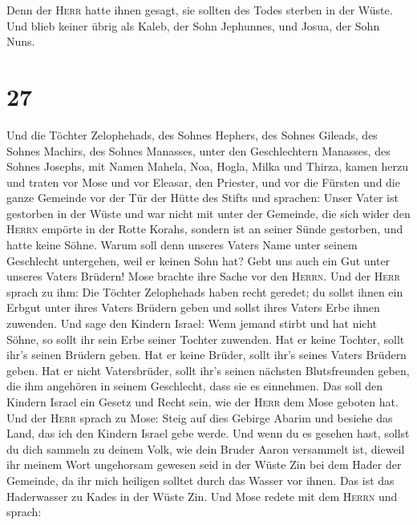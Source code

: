  Denn der \textsc{Herr} hatte ihnen gesagt, sie sollten
des Todes sterben in der Wüste. Und blieb keiner übrig als Kaleb, der
Sohn Jephunnes, und Josua, der Sohn Nuns.

\hypertarget{section-26}{%
\section{27}\label{section-26}}

 Und die Töchter Zelophehads, des Sohnes Hephers, des
Sohnes Gileads, des Sohnes Machirs, des Sohnes Manasses, unter den
Geschlechtern Manasses, des Sohnes Josephs, mit Namen Mahela, Noa,
Hogla, Milka und Thirza, kamen herzu  und traten vor Mose
und vor Eleasar, den Priester, und vor die Fürsten und die ganze
Gemeinde vor der Tür der Hütte des Stifts und sprachen: 
Unser Vater ist gestorben in der Wüste und war nicht mit unter der
Gemeinde, die sich wider den \textsc{Herrn} empörte in der Rotte Korahs,
sondern ist an seiner Sünde gestorben, und hatte keine Söhne.
 Warum soll denn unseres Vaters Name unter seinem
Geschlecht untergehen, weil er keinen Sohn hat? Gebt uns auch ein Gut
unter unseres Vaters Brüdern!  Mose brachte ihre Sache vor
den \textsc{Herrn}.  Und der \textsc{Herr} sprach zu ihm:
 Die Töchter Zelophehads haben recht geredet; du sollst
ihnen ein Erbgut unter ihres Vaters Brüdern geben und sollst ihres
Vaters Erbe ihnen zuwenden.  Und sage den Kindern Israel:
Wenn jemand stirbt und hat nicht Söhne, so sollt ihr sein Erbe seiner
Tochter zuwenden.  Hat er keine Tochter, sollt ihr's
seinen Brüdern geben.  Hat er keine Brüder, sollt ihr's
seines Vaters Brüdern geben.  Hat er nicht Vatersbrüder,
sollt ihr's seinen nächsten Blutsfreunden geben, die ihm angehören in
seinem Geschlecht, dass sie es einnehmen. Das soll den Kindern Israel
ein Gesetz und Recht sein, wie der \textsc{Herr} dem Mose geboten hat.
 Und der \textsc{Herr} sprach zu Mose: Steig auf dies
Gebirge Abarim und besiehe das Land, das ich den Kindern Israel gebe
werde.  Und wenn du es gesehen hast, sollst du dich
sammeln zu deinem Volk, wie dein Bruder Aaron versammelt ist,
 dieweil ihr meinem Wort ungehorsam gewesen seid in der
Wüste Zin bei dem Hader der Gemeinde, da ihr mich heiligen solltet durch
das Wasser vor ihnen. Das ist das Haderwasser zu Kades in der Wüste Zin.
 Und Mose redete mit dem \textsc{Herrn} und sprach:
